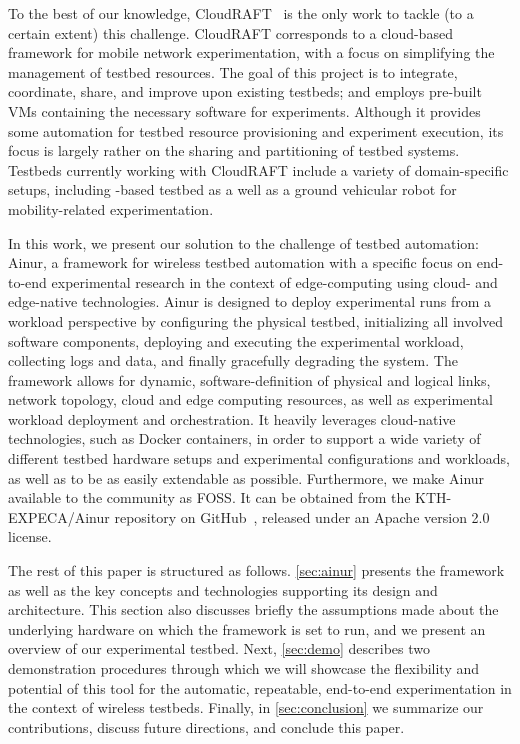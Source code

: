 To the best of our knowledge, CloudRAFT~\cite{cloudraft} is the only work to tackle (to a certain extent) this challenge.
CloudRAFT corresponds to a cloud-based framework for mobile network experimentation, with a focus on simplifying the management of testbed resources.
The goal of this project is to integrate, coordinate, share, and improve upon existing testbeds; and employs pre-built \acp{VM} containing the necessary software for experiments.
Although it provides some automation for testbed resource provisioning and experiment execution, its focus is largely rather on the sharing and partitioning of testbed systems.
Testbeds currently working with CloudRAFT include a variety of domain-specific setups, including -based testbed as a well as a ground vehicular robot for mobility-related experimentation.

In this work, we present our solution to the challenge of testbed automation: Ainur, a framework for wireless testbed automation with a specific focus on end-to-end experimental research in the context of edge-computing using cloud- and edge-native technologies.
Ainur is designed to deploy experimental runs from a workload perspective by configuring the physical testbed, initializing all involved software components, deploying and executing the experimental workload, collecting logs and data, and finally gracefully degrading the system.
The framework allows for dynamic, software-definition of physical and logical links, network topology, cloud and edge computing resources, as well as experimental workload deployment and orchestration.
It heavily leverages cloud-native technologies, such as Docker containers, in order to support a wide variety of different testbed hardware setups and experimental configurations and workloads, as well as to be as easily extendable as possible.
Furthermore, we make Ainur available to the community as \ac{FOSS}.
It can be obtained from the {KTH-EXPECA/Ainur} repository on GitHub~\cite{ainur:github}, released under an Apache version \num{2.0} license.

The rest of this paper is structured as follows.
\cref{sec:ainur} presents the framework as well as the key concepts and technologies supporting its design and architecture.
This section also discusses briefly the assumptions made about the underlying hardware on which the framework is set to run, and we present an overview of our experimental testbed.
Next, \cref{sec:demo} describes two demonstration procedures through which we will showcase the flexibility and potential of this tool for the automatic, repeatable, end-to-end experimentation in the context of wireless testbeds.
Finally, in \cref{sec:conclusion} we summarize our contributions, discuss future directions, and conclude this paper.


